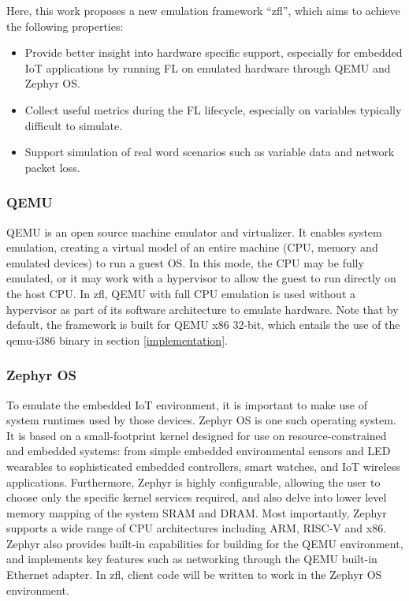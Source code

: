 \documentclass[12pt]{article}
\begin{document}
Here, this work proposes a new emulation framework ``zfl'', which aims to achieve the following
properties:
\begin{itemize}
  \item Provide better insight into hardware specific support, especially for embedded IoT
    applications by running FL on emulated hardware through QEMU and Zephyr OS.
  \item Collect useful metrics during the FL lifecycle, especially on variables typically difficult
    to simulate.
  \item Support simulation of real word scenarios such as variable data and network packet loss.
\end{itemize}

\subsubsection{QEMU}
QEMU\cite{qemu} is an open source machine emulator and virtualizer. It enables system emulation,
creating a virtual model of an entire machine (CPU, memory and emulated devices) to run a guest OS.
In this mode, the CPU may be fully emulated, or it may work with a hypervisor to allow the guest to
run directly on the host CPU. In zfl, QEMU with full CPU emulation is used without a hypervisor as
part of its software architecture to emulate hardware. Note that by default, the framework
is built for QEMU x86 32-bit, which entails the use of the qemu-i386 binary in section \ref{implementation}.

\subsubsection{Zephyr OS}
To emulate the embedded IoT environment, it is important to make use of system runtimes
used by those devices. Zephyr OS\cite{zephyr} is one such operating system. It is based on a small-footprint kernel designed for use on resource-constrained
and embedded systems: from simple embedded environmental sensors and LED wearables to sophisticated embedded controllers, smart watches, and IoT wireless applications.
Furthermore, Zephyr is highly configurable, allowing the user to choose only the specific kernel
services required, and also delve into lower level memory mapping of the system SRAM and DRAM. Most
importantly, Zephyr supports a wide range of CPU architectures including ARM, RISC-V and x86.
Zephyr also provides built-in capabilities for building for the QEMU environment, and implements key
features such as networking through the QEMU built-in Ethernet adapter. In zfl,
client code will be written to work in the Zephyr OS environment.
\end{document}
